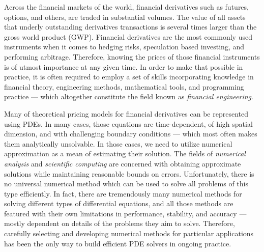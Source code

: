 \documentclass{UUThesisTemplate}
\begin{document}
\par
Across the financial markets of the world, financial derivatives such as futures, options, and others, are traded in substantial volumes. The value of all assets that underly outstanding derivatives transactions is several times larger than the gross world product (GWP). Financial derivatives are the most commonly used instruments when it comes to hedging risks, speculation based investing, and performing arbitrage. Therefore, knowing the prices of those financial instruments is of utmost importance at any given time. In order to make that possible in practice, it is often required to employ a set of skills incorporating knowledge in financial theory, engineering methods, mathematical tools, and programming practice --- which altogether constitute the field known as \emph{financial engineering}. 

\par
Many of theoretical pricing models for financial derivatives can be represented using PDEs. In many cases, those equations are time-dependent, of high spatial dimension, and with challenging boundary conditions --- which most often makes them analytically unsolvable. In those cases, we need to utilize numerical approximation as a mean of estimating their solution. The fields of \emph{numerical analysis} and \emph{scientific computing} are concerned with obtaining approximate solutions while maintaining reasonable bounds on errors. Unfortunately, there is no universal numerical method which can be used to solve all problems of this type efficiently. In fact, there are tremendously many numerical methods for solving different types of differential equations, and all those methods are featured with their own limitations in performance, stability, and accuracy --- mostly dependent on details of the problems they aim to solve. Therefore, carefully selecting and developing numerical methods for particular applications has been the only way to build efficient PDE solvers in ongoing practice. 
\end{document}

